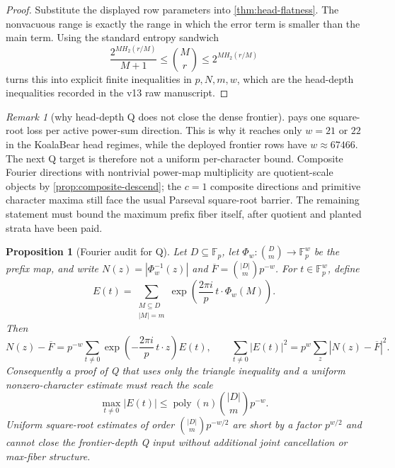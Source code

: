 \documentclass[a4paper,11pt]{amsart}
\newtheorem{proposition}[theorem]{Proposition}
\theoremstyle{remark}
\newtheorem{remark}[theorem]{Remark}
\newcommand{\F}{\mathbb F}
\newcommand{\poly}{\operatorname{poly}}
\begin{document}
\begin{proof}
Substitute the displayed row parameters into \cref{thm:head-flatness}.  The nonvacuous range is exactly the range in which the error term is smaller than the main term.  Using the standard entropy sandwich
\[
        \frac{2^{M H_2(r/M)}}{M+1}\le \binom Mr\le 2^{M H_2(r/M)}
\]
turns this into explicit finite inequalities in \(p,N,m,w\), which are the head-depth inequalities recorded in the v13 raw manuscript.
\end{proof}

\begin{remark}[why head-depth Q does not close the dense frontier]\label{rem:head-does-not-close-q}
 pays one square-root loss per active power-sum direction.  This is why it reaches only \(w=21\) or \(22\) in the KoalaBear head regimes, while the deployed frontier rows have \(w\approx 67466\).  The next Q target is therefore not a uniform per-character bound.  Composite Fourier directions with nontrivial power-map multiplicity are quotient-scale objects by \cref{prop:composite-descend}; the \(c=1\) composite directions and primitive character maxima still face the usual Parseval square-root barrier.  The remaining statement must bound the maximum prefix fiber itself, after quotient and planted strata have been paid.
\end{remark}

\begin{proposition}[Fourier audit for Q]\label{prop:fourier-audit}
Let \(D\subseteq\F_p\), let \(\Phi_w:\binom{D}{m}\to\F_p^w\) be the prefix map, and write \(N(z)=|\Phi_w^{-1}(z)|\) and \(\overline F=\binom{|D|}{m}p^{-w}\).  For \(t\in\F_p^w\), define
\[
        E(t)=
        \sum_{\substack{M\subseteq D\\ |M|=m}}
        \exp\left(\frac{2\pi i}{p}\,t\cdot\Phi_w(M)\right).
\]
Then
\[
        N(z)-\overline F
        =
        p^{-w}\sum_{t\ne0}
        \exp\left(-\frac{2\pi i}{p}\,t\cdot z\right)E(t),
        \qquad
        \sum_{t\ne0}|E(t)|^2=p^w\sum_z |N(z)-\overline F|^2 .
\]
Consequently a proof of Q that uses only the triangle inequality and a uniform nonzero-character estimate must reach the scale
\[
        \max_{t\ne0}|E(t)|\le \poly(n)\binom{|D|}{m}p^{-w}.
\]
Uniform square-root estimates of order \(\binom{|D|}{m}p^{-w/2}\) are short by a factor \(p^{w/2}\) and cannot close the frontier-depth Q input without additional joint cancellation or max-fiber structure.
\end{proposition}
\end{document}
